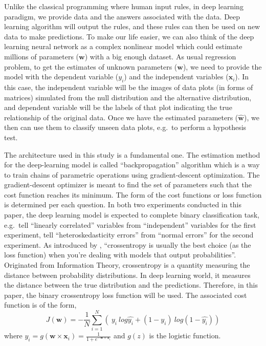 \documentclass[12pt]{article}
\begin{document}
Unlike the classical programming where human input rules, in deep
learning paradigm, we provide data and the answers associated with the
data. Deep learning algorithm will output the rules, and these rules can
then be used on new data to make predictions. To make our life easier,
we can also think of the deep learning neural network as a complex
nonlinear model which could estimate millions of parameters
(\(\textbf{w}\)) with a big enough dataset. As usual regression problem,
to get the estimates of unknown parameters (\(\textbf{w}\)), we need to
provide the model with the dependent variable (\(y_i\)) and the
independent variables (\(\textbf{x}_i\)). In this case, the independent
variable will be the images of data plots (in forms of matrices)
simulated from the null distribution and the alternative distribution,
and dependent variable will be the labels of that plot indicating the
true relationship of the original data. Once we have the estimated
parameters (\(\hat{\textbf{w}}\)), we then can use them to classify
unseen data plots, e.g.~to perform a hypothesis test.

The architecture used in this study is a fundamental one. The estimation
method for the deep-learning model is called ``backpropagation''
algorithm which is a way to train chains of parametric operations using
gradient-descent optimization. The gradient-descent optimizer is meant
to find the set of parameters such that the cost function reaches its
minimum. The form of the cost functions or loss function is determined
per each question. In both two experiments conducted in this paper, the
deep learning model is expected to complete binary classification task,
e.g.~tell ``linearly correlated'' variables from ``independent''
variables for the first experiment, tell ``heteroskedasticity errors''
from ``normal errors'' for the second experiment. As introduced by
\citet{DLR18}, ``crossentropy is usually the best choice (as the loss
function) when you're dealing with models that output probabilities''.
Originated from Information Theory, crossentropy is a quantity measuring
the distance between probability distributions. In deep learning world,
it measures the distance between the true distribution and the
predictions. Therefore, in this paper, the binary crossentropy loss
function will be used. The associated cost function is of the form,
\[J(\textbf{w})=- \frac{1}{N}\sum_{i=1}^N\left(  
\ y_i\ log\hat{y_i}+(1-y_i)\ log(1-\hat{y_i})  
\right)\] where
\(\hat{y_i} = g(\textbf{w} \times \textbf{x}_i) = \frac{1}{1+e^{-\textbf{w} \times \textbf{x}_i}}\)
and \(g(z)\) is the logistic function.
\end{document}
